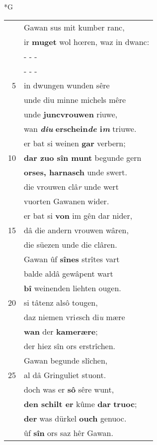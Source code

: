 \documentclass[8pt,a4paper,notitlepage]{article}
\begin{document}
\newpage
\begin{table}[ht]
\begin{minipage}[t]{0.5\linewidth}
\small
\begin{center}*G
\end{center}
\begin{tabular}{rl}
 & Gawan sus mit kumber ranc,\\ 
 & ir \textbf{muget} wol hœren, waz in dwanc:\\ 
 & \multicolumn{1}{l}{ - - - }\\ 
 & \multicolumn{1}{l}{ - - - }\\ 
5 & in dwungen wunden sêre\\ 
 & unde diu minne michels mêre\\ 
 & unde \textbf{juncvrouwen} riuwe,\\ 
 & wan \textit{\textbf{diu}} \textbf{erschein\textit{de} i\textit{m}} triuwe.\\ 
 & er bat si weinen \textbf{gar} verbern;\\ 
10 & \textbf{dar zuo sîn munt} begunde gern\\ 
 & \textbf{orses, harnasch} unde swert.\\ 
 & die vrouwen clâ\textit{r} unde wert\\ 
 & vuorten Gawanen wider.\\ 
 & er bat si \textbf{von} im gên dar nider,\\ 
15 & dâ die andern vrouwen wâren,\\ 
 & die süezen unde die clâren.\\ 
 & Gawan ûf \textbf{sînes} strîtes vart\\ 
 & balde aldâ gewâpent wart\\ 
 & \textbf{bî} weinenden liehten ougen.\\ 
20 & si tâtenz alsô tougen,\\ 
 & daz niemen vri\textit{e}sch di\textit{u} mære\\ 
 & \textbf{wan} der \textbf{kamerære};\\ 
 & der hiez sîn ors erstrîchen.\\ 
 & Gawan begunde slîchen,\\ 
25 & al dâ Gringuliet stuont.\\ 
 & doch was er \textbf{sô} sêre wunt,\\ 
 & \textbf{den schilt er} kûme \textbf{dar} \textbf{truoc};\\ 
 & \textbf{der} was dürkel \textbf{ouch} genuoc.\\ 
 & ûf \textbf{sîn} ors saz hêr Gawan.\\ 

\end{tabular}
\end{minipage}
\end{table}
\end{document}
